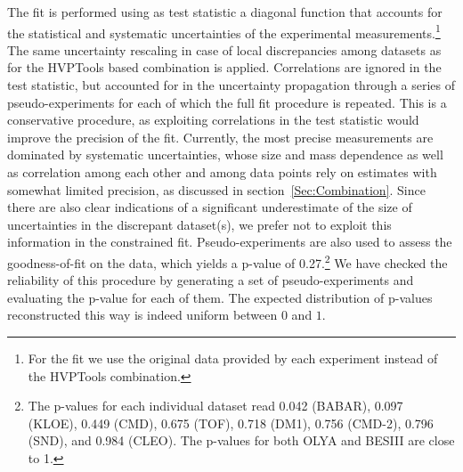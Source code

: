The fit is performed using as test statistic a diagonal \chiS function that accounts for the statistical and systematic uncertainties of the experimental measurements.\footnote{For the fit we use the original data provided by each experiment instead of the HVPTools combination.} The same uncertainty rescaling in case of local discrepancies among datasets as for the HVPTools based combination is applied. Correlations are ignored in the test statistic, but accounted for in the uncertainty propagation through a series of pseudo-experiments for each of which the full fit procedure is repeated. This is a conservative procedure, as exploiting correlations in the test statistic would improve the precision of the fit.
Currently, the most precise measurements are dominated by systematic uncertainties, whose size and mass dependence as well as correlation among each other and among data points rely on estimates with somewhat limited precision, as discussed in section~\ref{Sec:Combination}.
Since there are also clear indications of a significant underestimate of the size of uncertainties in the discrepant dataset(s), we prefer not to exploit this information in the constrained fit.
Pseudo-experiments are also used to assess the goodness-of-fit on the data, which yields a p-value of 0.27.\footnote{The p-values for each individual dataset read 0.042 (BABAR), 0.097 (KLOE), 0.449 (CMD), 0.675 (TOF), 0.718 (DM1), 0.756 (CMD-2), 0.796 (SND), and 0.984 (CLEO). The p-values for both OLYA and BESIII are close to 1.}
We have checked the reliability of this procedure by generating a set of pseudo-experiments and evaluating the p-value for each of them.
The expected distribution of p-values reconstructed this way is indeed uniform between $0$ and $1$.


